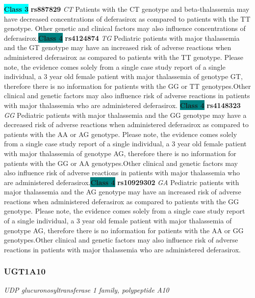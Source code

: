 \documentclass{report}
\begin{document}
\textbf{\colorbox{cyan} {Class 3}} \textbf{ rs887829 } \textit{ CT }
Patients with the CT genotype and beta-thalassemia may have decreased concentrations of deferasirox as compared to patients with the TT genotype. Other genetic and clinical factors may also influence concentrations of deferasirox.\newline\textbf{\colorbox{teal} {Class 4}} \textbf{ rs4124874 } \textit{ TG }
Pediatric patients with major thalassemia and the GT genotype may have an increased risk of adverse reactions when administered deferasirox as compared to patients with the TT genotype. Please note, the evidence comes solely from a single case study report of a single individual, a 3 year old female patient with major thalassemia of genotype GT, therefore there is no information for patients with the GG or TT genotypes.Other clinical and genetic factors may also influence risk of adverse reactions in patients with major thalassemia who are administered deferasirox. \newline\textbf{\colorbox{teal} {Class 4}} \textbf{ rs4148323 } \textit{ GG }
Pediatric patients with major thalassemia and the GG genotype may have a decreased risk of adverse reactions when administered deferasirox as compared to patients with the AA or AG genotype. Please note, the evidence comes solely from a single case study report of a single individual, a 3 year old female patient with major thalassemia of genotype AG, therefore there is no information for patients with the GG or AA genotypes.Other clinical and genetic factors may also influence risk of adverse reactions in patients with major thalassemia who are administered deferasirox.\newline\textbf{\colorbox{teal} {Class 4}} \textbf{ rs10929302 } \textit{ GA }
Pediatric patients with major thalassemia and the AG genotype may have an increased risk of adverse reactions when administered deferasirox as compared to patients with the GG genotype. Please note, the evidence comes solely from a single case study report of a single individual, a 3 year old female patient with major thalassemia of genotype AG, therefore there is no information for patients with the AA or GG genotypes.Other clinical and genetic factors may also influence risk of adverse reactions in patients with major thalassemia who are administered deferasirox.\newline\subsubsection{ UGT1A10 }
\textit{ UDP glucuronosyltransferase 1 family, polypeptide A10 }
\end{document}
